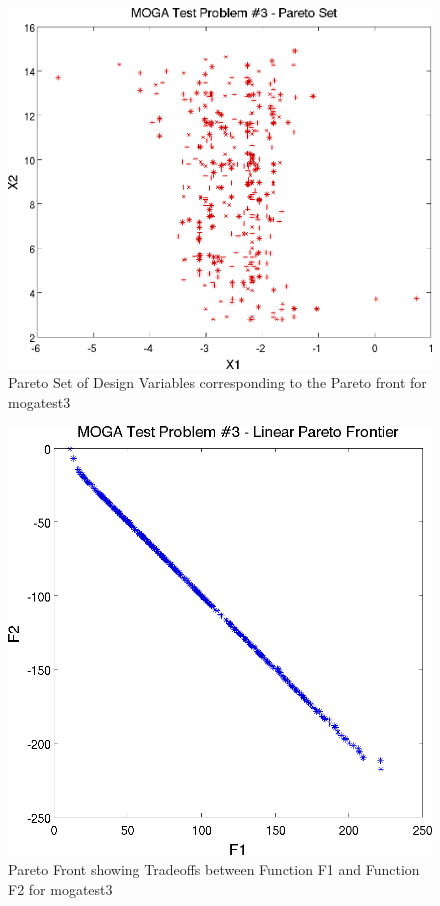 \begin{figure}
  \centering
  \includegraphics[scale=0.75]{images/dakota_mogatest3_pareto_set}
  \caption{Pareto Set of Design Variables corresponding to the Pareto
    front for mogatest3}
  \label{additional:moga3set}
\end{figure}

\begin{figure}
  \centering
  \includegraphics[scale=0.75]{images/dakota_mogatest3_pareto_front}
  \caption{Pareto Front showing Tradeoffs between Function F1 and
    Function F2 for mogatest3}
  \label{additional:moga3front}
\end{figure}

